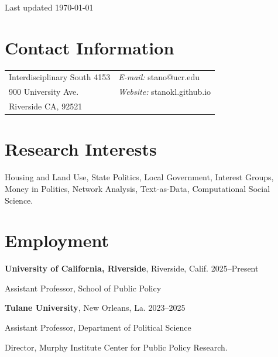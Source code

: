 \documentclass[margin,line]{res}
\newenvironment{list1}{
  \begin{list}{\ding{113}}{%
      \setlength{\itemsep}{0in}
      \setlength{\parsep}{0in} \setlength{\parskip}{0in}
      \setlength{\topsep}{0in} \setlength{\partopsep}{0in} 
      \setlength{\leftmargin}{0.17in}}}{\end{list}}
\begin{document}

\begin{flushright}
Last updated \today
\end{flushright}

\begin{resume}

\section{\sc Contact Information}
\vspace{.05in}
\begin{tabular}{@{}p{2in}p{4in}}

Interdisciplinary South 4153 & {\it E-mail:} stano@ucr.edu \\
900 University Ave.&  {\it Website:} stanokl.github.io \\           
Riverside CA, 92521 &

\end{tabular}


\section{\sc Research Interests}
\vspace{.05in}
Housing and Land Use, State Politics, Local Government, Interest Groups, Money in Politics, Network Analysis, Text-as-Data, Computational Social Science.


\section{\sc Employment}

{\bf University of California, Riverside}, Riverside, Calif. \hfill 2025--Present\\
\vspace*{-.1in}
\begin{list1}
\item[] Assistant Professor, School of Public Policy 
\vspace*{.05in}
\end{list1}


{\bf Tulane University}, New Orleans, La. \hfill 2023--2025\\
\vspace*{-.1in}
\begin{list1}
\item[] Assistant Professor, Department of Political Science
\item[] Director, Murphy Institute Center for Public Policy Research. 
\vspace*{.05in}
\end{list1}




\end{resume}
\end{document}
